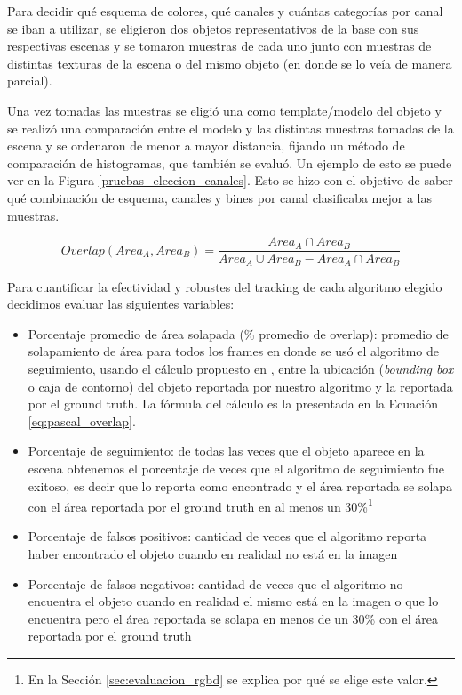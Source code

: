 Para decidir qué esquema de colores, qué canales y cuántas categorías por canal se iban a utilizar, se eligieron dos objetos representativos de la base con sus respectivas escenas y se tomaron muestras de cada uno junto con muestras de distintas texturas de la escena o del mismo objeto (en donde se lo veía de manera parcial).

Una vez tomadas las muestras se eligió una como template/modelo del objeto y se realizó una comparación entre el modelo y las distintas muestras tomadas de la escena y se ordenaron de menor a mayor distancia, fijando un método de comparación de histogramas, que también se evaluó. Un ejemplo de esto se puede ver en la Figura \ref{pruebas_eleccion_canales}. Esto se hizo con el objetivo de saber qué combinación de esquema, canales y bines por canal clasificaba mejor a las muestras.

\begin{equation}\label{eq:pascal_overlap}
Overlap(Area_A, Area_B) = \frac{Area_A \cap Area_B}{Area_A \cup Area_B - Area_A \cap Area_B}
\end{equation}


Para cuantificar la efectividad y robustes del tracking de cada algoritmo elegido decidimos evaluar las siguientes variables:
\begin{itemize}
	\item Porcentaje promedio de área solapada (\% promedio de overlap): promedio de solapamiento de área para todos los frames en donde se usó el algoritmo de seguimiento, usando el cálculo propuesto en \cite{everinghampascal}, entre la ubicación (\textit{bounding box} o caja de contorno) del objeto reportada por nuestro algoritmo y la reportada por el ground truth. La fórmula del cálculo es la presentada en la Ecuación \ref{eq:pascal_overlap}.
	\item Porcentaje de seguimiento: de todas las veces que el objeto aparece en la escena obtenemos el porcentaje de veces que el algoritmo de seguimiento fue exitoso, es decir que lo reporta como encontrado y el área reportada se solapa con el área reportada por el ground truth en al menos un 30\%\footnote{En la Sección \ref{sec:evaluacion_rgbd} se explica por qué se elige este valor.}
	\item Porcentaje de falsos positivos: cantidad de veces que el algoritmo reporta haber encontrado el objeto cuando en realidad no está en la imagen
	\item Porcentaje de falsos negativos: cantidad de veces que el algoritmo no encuentra el objeto cuando en realidad el mismo está en la imagen o que lo encuentra pero el área reportada se solapa en menos de un 30\% con el área reportada por el ground truth
\end{itemize}

